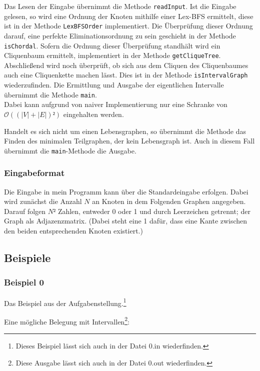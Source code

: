 Das Lesen der Eingabe übernimmt die Methode \texttt{readInput}. Ist die Eingabe gelesen, so wird eine Ordnung der Knoten mithilfe einer Lex-BFS ermittelt, diese ist in der Methode \texttt{LexBFSOrder} implementiert. Die Überprüfung dieser Ordnung darauf, eine perfekte Eliminationsordnung zu sein geschieht in der Methode \texttt{isChordal}. Sofern die Ordnung dieser Überprüfung standhält wird ein Cliquenbaum ermittelt, implementiert in der Methode \texttt{getCliqueTree}. Abschließend wird noch überprüft, ob sich aus dem Cliquen des Cliquenbaumes auch eine Cliquenkette machen lässt. Dies ist in der Methode \texttt{isIntervalGraph} wiederzufinden. Die Ermittlung und Ausgabe der eigentlichen Intervalle übernimmt die Methode \texttt{main}.\\
Dabei kann aufgrund von naiver Implementierung nur eine Schranke von $\mathcal{O}((|V| + |E|)²)$ eingehalten werden.

Handelt es sich nicht um einen Lebensgraphen, so übernimmt die Methode \texttt{} das Finden des minimalen Teilgraphen, der kein Lebensgraph ist. Auch in diesem Fall übernimmt die \texttt{main}-Methode die Ausgabe.

\subsubsection{Eingabeformat}

Die Eingabe in mein Programm kann über die Standardeingabe erfolgen. Dabei wird zunächst die Anzahl $N$ an Knoten in dem Folgenden Graphen angegeben. Darauf folgen $N²$ Zahlen, entweder 0 oder 1 und durch Leerzeichen getrennt; der Graph als Adjazenzmatrix. (Dabei steht eine 1 dafür, dass eine Kante zwischen den beiden entsprechenden Knoten existiert.)
 
\subsection{Beispiele}
\subsubsection*{Beispiel 0}
Das Beispiel aus der Aufgabenstellung.\footnote{Dieses Beispiel lässt sich auch in der Datei 0.in wiederfinden.}

{\small

}

Eine mögliche Belegung mit Intervallen\footnote{Diese Ausgabe lässt sich auch in der Datei 0.out wiederfinden.}:

{\small

}

